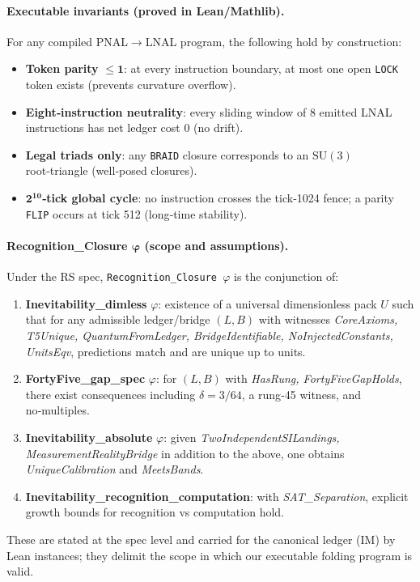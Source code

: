 \documentclass[12pt,a4paper]{article}
\begin{document}
\paragraph{Executable invariants (proved in Lean/Mathlib).}
For any compiled PNAL$\to$LNAL program, the following hold by construction:
\begin{itemize}
  \item \textbf{Token parity} $\boldsymbol{\leq 1}$: at every instruction boundary, at most one open \texttt{LOCK} token exists (prevents curvature overflow).
  \item \textbf{Eight‑instruction neutrality}: every sliding window of 8 emitted LNAL instructions has net ledger cost $0$ (no drift).
  \item \textbf{Legal triads only}: any \texttt{BRAID} closure corresponds to an $\mathrm{SU}(3)$ root‑triangle (well‑posed closures).
  \item \textbf{$\boldsymbol{2^{10}}$‑tick global cycle}: no instruction crosses the tick‑1024 fence; a parity \texttt{FLIP} occurs at tick 512 (long‑time stability).
\end{itemize}

\paragraph{\texorpdfstring{Recognition\_Closure $\boldsymbol{\varphi}$}{Recognition_Closure φ} (scope and assumptions).}
Under the RS spec, \texttt{Recognition\_Closure $\varphi$} is the conjunction of:
\begin{enumerate}
  \item \textbf{Inevitability\_dimless} $\varphi$: existence of a universal dimensionless pack $U$ such that for any admissible ledger/bridge $(L,B)$ with witnesses \textit{CoreAxioms, T5Unique, QuantumFromLedger, BridgeIdentifiable, NoInjectedConstants, UnitsEqv}, predictions match and are unique up to units.
  \item \textbf{FortyFive\_gap\_spec} $\varphi$: for $(L,B)$ with \textit{HasRung, FortyFiveGapHolds}, there exist consequences including $\delta=3/64$, a rung‑45 witness, and no‑multiples.
  \item \textbf{Inevitability\_absolute} $\varphi$: given \textit{TwoIndependentSILandings, MeasurementRealityBridge} in addition to the above, one obtains \textit{UniqueCalibration} and \textit{MeetsBands}.
  \item \textbf{Inevitability\_recognition\_computation}: with \textit{SAT\_Separation}, explicit growth bounds for recognition vs computation hold.
\end{enumerate}
These are stated at the spec level and carried for the canonical ledger (IM) by Lean instances; they delimit the scope in which our executable folding program is valid.
\end{document}
